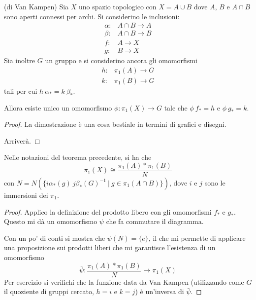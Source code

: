 \begin{thm}(di Van Kampen)
    Sia $X$ uno spazio topologico con $X=A\cup B$ dove $A$, $B$ e $A\cap B$ sono aperti connessi per archi. Si considerino le inclusioni:
    \begin{align*}
        \alpha\colon& A\cap B \longrightarrow A\\
        \beta\colon& A\cap B \longrightarrow B\\
        f\colon& A \longrightarrow X\\
        g\colon& B \longrightarrow X
    \end{align*}
    Sia inoltre $G$ un gruppo e si considerino ancora gli omomorfismi
    \begin{align*}
        h\colon& \pi_1(A)\longrightarrow G\\
        k\colon& \pi_1(B)\longrightarrow G
    \end{align*}
    tali per cui $h\ \alpha_* = k\ \beta_*$.

    Allora esiste unico un omomorfismo $\phi\colon\pi_1(X)\longrightarrow G$ tale che $\phi\ f_* = h$ e $\phi\ g_*=k$.
\end{thm}

\begin{proof}
    La dimostrazione \`e una cosa bestiale in termini di grafici e disegni.

     Arriver\`a.
\end{proof}

\begin{cor}
    Nelle notazioni del teorema precedente, si ha che
    \[
        \pi_1(X)\cong \frac{\pi_1(A) * \pi_1(B)}{N}
    \]
    con $N = N(\{i\alpha_*(g)\ j \beta_*(G)^{-1}\ |\ g\in\pi_1(A\cap B)\})$, dove $i$ e $j$ sono le immersioni dei $\pi_1$.
\end{cor}
\begin{proof}
    Applico la definizione del prodotto libero con gli omomorfismi $f_*$ e $g_*$. Questo mi d\`a un omomorfismo $\psi$ che fa commutare il diagramma.
    \begin{center}\end{center}
    Con un po' di conti si mostra che $\psi(N)=\{e\}$, il che mi permette di applicare una proposizione sui prodotti liberi che mi garantisce l'esistenza di un omomorfismo
    \[
        \bar{\psi}\colon \frac{\pi_1(A) * \pi_1(B)}{N} \longrightarrow \pi_1(X)
    \]
    Per esercizio si verifichi che la funzione data da Van Kampen (utilizzando come $G$ il quoziente di gruppi cercato, $h=i$ e $k=j$) \`e un'inversa di $\bar{\psi}$.
\end{proof}


